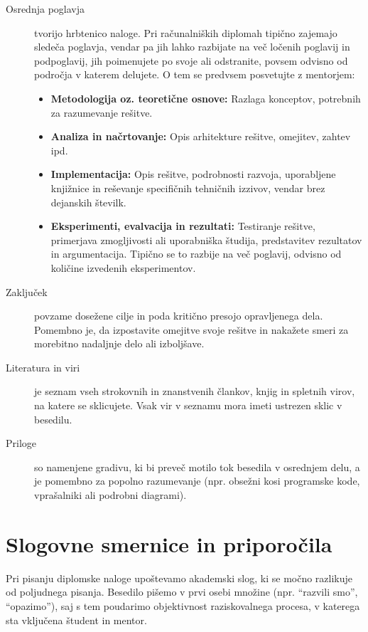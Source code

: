 \documentclass[a4paper,12pt,openright]{book}
\begin{document}
\begin{description}
    \item[Osrednja poglavja] tvorijo hrbtenico naloge. Pri računalniških diplomah tipično zajemajo sledeča poglavja, vendar pa jih lahko razbijate na več ločenih poglavij in podpoglavij, jih poimenujete po svoje ali odstranite, povsem odvisno od področja v katerem delujete. O tem se predvsem posvetujte z mentorjem:
    \begin{itemize}
        \item \textbf{Metodologija oz. teoretične osnove:} Razlaga konceptov, potrebnih za razumevanje rešitve.
        \item \textbf{Analiza in načrtovanje:} Opis arhitekture rešitve, omejitev, zahtev ipd.
        \item \textbf{Implementacija:} Opis rešitve, podrobnosti razvoja, uporabljene knjižnice in reševanje specifičnih tehničnih izzivov, vendar brez dejanskih številk.
        \item \textbf{Eksperimenti, evalvacija in rezultati:} Testiranje rešitve, primerjava zmogljivosti ali uporabniška študija, predstavitev rezultatov in argumentacija. Tipično se to razbije na več poglavij, odvisno od količine izvedenih eksperimentov.
    \end{itemize}
    
    \item[Zaključek] povzame dosežene cilje in poda kritično presojo opravljenega dela. Pomembno je, da izpostavite omejitve svoje rešitve in nakažete smeri za morebitno nadaljnje delo ali izboljšave.
    
    \item[Literatura in viri] je seznam vseh strokovnih in znanstvenih člankov, knjig in spletnih virov, na katere se sklicujete. Vsak vir v seznamu mora imeti ustrezen sklic v besedilu.
    
    \item[Priloge] so namenjene gradivu, ki bi preveč motilo tok besedila v osrednjem delu, a je pomembno za popolno razumevanje (npr. obsežni kosi programske kode, vprašalniki ali podrobni diagrami).
\end{description}

\section{Slogovne smernice in priporočila}

Pri pisanju diplomske naloge upoštevamo akademski slog, ki se močno razlikuje od poljudnega pisanja. Besedilo pišemo v prvi osebi množine (npr. \enquote{razvili smo}, \enquote{opazimo}), saj s tem poudarimo objektivnost raziskovalnega procesa, v katerega sta vključena študent in mentor.
\end{document}
